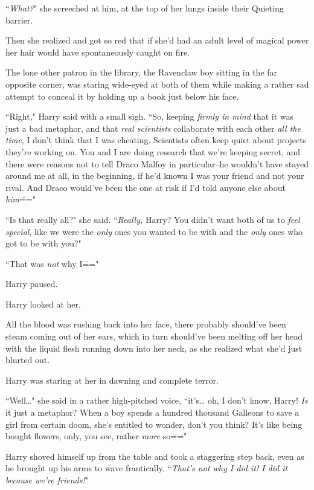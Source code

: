 ``\emph{What?}" she screeched at him, at the top of her lungs inside their Quieting barrier.

Then she realized and got so red that if she'd had an adult level of magical power her hair would have spontaneously caught on fire.

The lone other patron in the library, the Ravenclaw boy sitting in the far opposite corner, was staring wide-eyed at both of them while making a rather sad attempt to conceal it by holding up a book just below his face.

``Right," Harry said with a small sigh. ``So, keeping \emph{firmly in mind} that it was just a bad metaphor, and that \emph{real scientists} collaborate with each other \emph{all the time}, I don't think that I was cheating. Scientists often keep quiet about projects they're working on. You and I are doing research that we're keeping secret, and there were reasons not to tell Draco Malfoy in particular\---he wouldn't have stayed around me at all, in the beginning, if he'd known I was your friend and not your rival. And Draco would've been the one at risk if I'd told anyone else about \emph{him}\==="

``Is that really all?" she said. ``\emph{Really,} Harry? You didn't want both of us to \emph{feel special}, like we were the \emph{only} ones you wanted to be with and the \emph{only} ones who got to be with you?"

``That was \emph{not} why I\==="

Harry paused.

Harry looked at her.

All the blood was rushing back into her face, there probably should've been steam coming out of her ears, which in turn should've been melting off her head with the liquid flesh running down into her neck, as she realized what she'd just blurted out.

Harry was staring at her in dawning and complete terror.

``Well{\ldots}" she said in a rather high-pitched voice, ``it's{\ldots} oh, I don't know, Harry! \emph{Is} it just a metaphor? When a boy spends a hundred thousand Galleons to save a girl from certain doom, she's entitled to wonder, don't you think? It's like being bought flowers, only, you see, rather \emph{more} so\==="

Harry shoved himself up from the table and took a staggering step back, even as he brought up his arms to wave frantically. ``\emph{That's not why I did it! I did it because we're friends!}"

